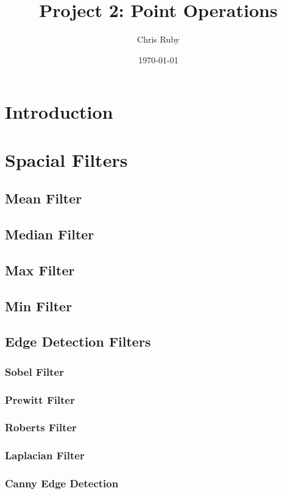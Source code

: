 \documentclass[letterpaper,12pt]{article}
\begin{document}
\title{Project 2: Point Operations}
\author{Chris Ruby}
\date{\today}
\maketitle
\section{Introduction}

\section{Spacial Filters}
\subsection{Mean Filter}
\subsection{Median Filter}
\subsection{Max Filter}
\subsection{Min Filter}

\subsection{Edge Detection Filters}

\subsubsection{Sobel Filter}
\subsubsection{Prewitt Filter}
\subsubsection{Roberts Filter}
\subsubsection{Laplacian Filter}
\subsubsection{Canny Edge Detection}
\end{document}
